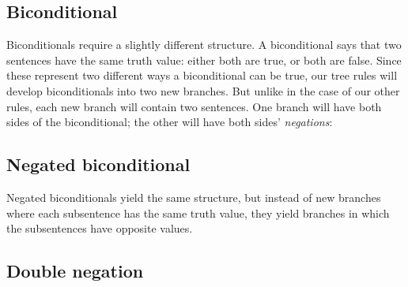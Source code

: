 
\subsection{Biconditional}

Biconditionals require a slightly different structure. A biconditional says that two sentences have the same truth value: either both are true, or both are false. Since these represent two different ways a biconditional can be true, our tree rules will develop biconditionals into two new branches. But unlike in the case of our other rules, each new branch will contain two sentences. One branch will have both sides of the biconditional; the other will have both sides' \emph{negations}:


\subsection{Negated biconditional}
\begin{groupitems}
Negated biconditionals yield the same structure, but instead of new branches where each subsentence has the same truth value, they yield branches in which the subsentences have opposite values.

\end{groupitems}

\subsection{Double negation}

